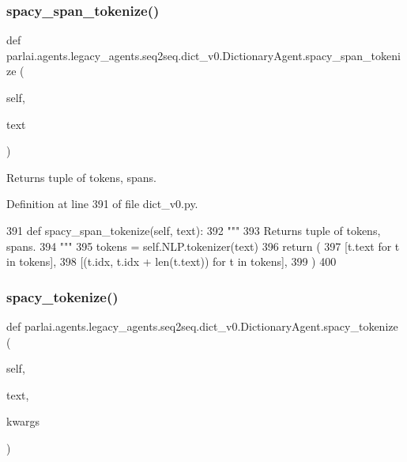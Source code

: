 \subsubsection{\texorpdfstring{spacy\+\_\+span\+\_\+tokenize()}{spacy\_span\_tokenize()}}
{\footnotesize\ttfamily def parlai.\+agents.\+legacy\+\_\+agents.\+seq2seq.\+dict\+\_\+v0.\+Dictionary\+Agent.\+spacy\+\_\+span\+\_\+tokenize (\begin{DoxyParamCaption}\item[{}]{self,  }\item[{}]{text }\end{DoxyParamCaption})}

\begin{DoxyVerb}Returns tuple of tokens, spans.
\end{DoxyVerb}
 

Definition at line 391 of file dict\+\_\+v0.\+py.


\begin{DoxyCode}
391     \textcolor{keyword}{def }spacy\_span\_tokenize(self, text):
392         \textcolor{stringliteral}{"""}
393 \textcolor{stringliteral}{        Returns tuple of tokens, spans.}
394 \textcolor{stringliteral}{        """}
395         tokens = self.NLP.tokenizer(text)
396         \textcolor{keywordflow}{return} (
397             [t.text \textcolor{keywordflow}{for} t \textcolor{keywordflow}{in} tokens],
398             [(t.idx, t.idx + len(t.text)) \textcolor{keywordflow}{for} t \textcolor{keywordflow}{in} tokens],
399         )
400 
\end{DoxyCode}
\mbox{\label{classparlai_1_1agents_1_1legacy__agents_1_1seq2seq_1_1dict__v0_1_1DictionaryAgent_a1064af1b19fec27e689ccd414e450e06}} 
\subsubsection{\texorpdfstring{spacy\+\_\+tokenize()}{spacy\_tokenize()}}
{\footnotesize\ttfamily def parlai.\+agents.\+legacy\+\_\+agents.\+seq2seq.\+dict\+\_\+v0.\+Dictionary\+Agent.\+spacy\+\_\+tokenize (\begin{DoxyParamCaption}\item[{}]{self,  }\item[{}]{text,  }\item[{}]{kwargs }\end{DoxyParamCaption})}



